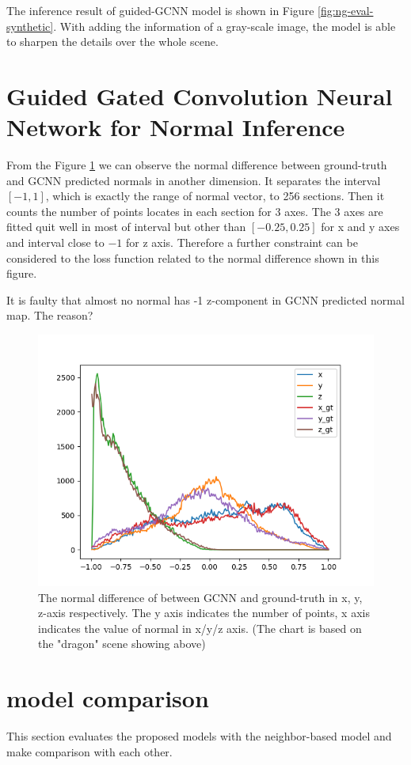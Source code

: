 The inference result of guided-GCNN model is shown in Figure \ref{fig:ng-eval-synthetic}. With adding the information of a gray-scale image, the model is able to sharpen the details over the whole scene. 




\section{Guided Gated Convolution Neural Network for Normal Inference }

From the Figure \ref{fig:normal-histo-diff} we can observe the normal difference between ground-truth and GCNN predicted normals in another dimension. It separates the interval $ \left[ -1,1 \right] $, which is exactly the range of normal vector, to 256 sections. Then it counts the number of points locates in each section for 3 axes.  The 3 axes are fitted quit well in most of interval but other than $ \left[ -0.25,0.25 \right] $ for x and y axes and  interval close to $ -1 $ for z axis. Therefore a further constraint can be considered to the loss function related to the normal difference shown in this figure.

It is faulty that almost no normal has -1 z-component in GCNN predicted normal map. The reason?
\begin{figure}[h!]
	\centering
	\includegraphics[width=\linewidth]{./Figures/normal-histo-diff.png}
	\caption{The normal difference of between GCNN and ground-truth in x, y, z-axis respectively. The y axis indicates the number of points, x axis indicates the value of normal in x/y/z axis. (The chart is based on the "dragon" scene showing above)}
	\label{fig:normal-histo-diff}
\end{figure}


\newpage 
\section{model comparison}
This section evaluates the proposed models with the neighbor-based model and make comparison with each other.

